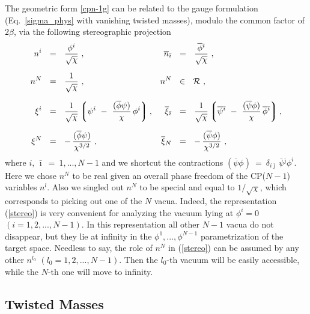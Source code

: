 \documentclass[12pt]{article}
\newcommand{\ov}{\overline}
\newcommand{\mc}[1]{\mathcal{#1}}
\newcommand{\lgr}{\left\lgroup}
\newcommand{\rgr}{\right\rgroup}
\newcommand{\bi}{{\bar \imath}}
\newcommand{\bj}{{\bar \jmath}}
\begin{document}
	The geometric form \eqref{cpn-1g} can be related to the gauge formulation (Eq.~\eqref{sigma_phys} with
	vanishing twisted masses), modulo the common factor of $ 2\beta $, via the following stereographic projection
\begin{align}
%
\notag
	n^i & ~~=~~ \frac{\phi^i}{\sqrt{\chi}}~,
	& 
	\ov{n}_\bi & ~~=~~ \frac{\ov{\phi}{}^\bi}{\sqrt{\chi}}~,
\\[2mm]
%
\label{stereo}
	n^N & ~~=~~ \frac{1}{\sqrt{\chi}}~,
	& n^N & ~~\in~~ \mc{R}~,
\\[2mm]
%
\notag
	\xi^i & ~~=~~ \frac{1}{\sqrt{\chi}} \lgr \psi^i ~-~ \frac{(\ov{\phi}\psi)}{\chi}\,\phi^i \rgr,
	& 
	\ov{\xi}{}_\bi & ~~=~~ \frac{1}{\sqrt{\chi}} 
					\lgr \ov{\psi}{}^\bi ~-~ \frac{(\ov{\psi}\phi)}{\chi}\, \ov{\phi}{}^\bi \rgr,
\\[2mm]
%
\notag
	\xi^N & ~~=~~ -\, \frac{(\ov{\phi} \psi)}{\chi^{3/2}}~,
	&
	\ov{\xi}{}_N & ~~=~~ -\, \frac{(\ov{\psi} \phi)}{\chi^{3/2}}~,
\end{align}
	where $	i,\, \bi ~=~ 1, ..., N-1 $ and we shortcut the contractions 
	$ (\ov{\psi} \phi) ~=~ \delta_{i\bj}\, \ov{\psi}{}^\bj \phi^i $.
	Here we chose $ n^N $ to be real given an overall phase freedom of the CP($N-1$) variables $ n^l $.
	Also we singled out $ n^N $ to be special and equal to $ 1/\sqrt{\chi} $, 
	which corresponds to picking out one of the $ N $ vacua. Indeed,
	the representation (\ref{stereo}) is very convenient for
	analyzing the vacuum lying at $\phi^i=0$ $(i=1,2, ..., N-1)$. In this representation all other $N-1$ vacua do not disappear, but they lie at infinity in the $\phi^1, ..., \phi^{N-1}$ parametrization of the target space.
Needless to say, the role of $n^N$ in (\ref{stereo}) can be assumed by any other
$n^{l_0}$  $(l_0 = 1,2, ..., N-1)$.	Then the $l_0$-th vacuum will be easily accessible, while
the $N$-th one will move to infinity.


\subsection{Twisted Masses}
\label{twim}
\end{document}
